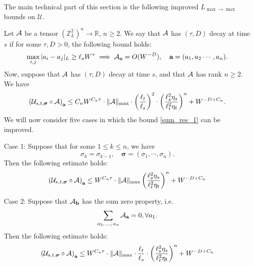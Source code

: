  \bigskip

The main technical part of this section is the following improved $L_{\max\to \max}$ bounds on $\mathcal{U}$.
 
\begin{lemma}\label{lem:sum_decay}

Let $\cal A$ be a tensor $\left(\mathbb{Z}_L^2\right)^n\to \mathbb R$, $n\ge 2$. We say that $\cal A$ has $(\tau, D)$ decay at time $s$ if  for some $\tau,D>0$, the following bound holds:
\begin{equation}\label{deccA0}
    \max_{i,j}|a_i-a_j|_{L}\ge \ell_s W^{\tau} \implies  {\cal A}_{\textbf{a}}=O(W^{-D}),\quad \textbf{a}=(a_1,a_2\cdots, a_n) .
\end{equation}
Now, suppose that $\cal A$ has $(\tau, D)$ decay at time $s$, and that $\cal A$ has rank $n\geq2$. We have
\begin{align}\label{sum_res_1}
    \left({\cal U}_{s,t,\boldsymbol{\sigma}} \circ {\cal A}\right)_\textbf{a} \le C_n W^{C_n\tau}\cdot   \|{\cal A}\|_{\max}
    \cdot \left(\frac{\ell_t}{\ell_s}\right)^{2}
    \cdot \left(\frac{\ell_s^{2}\eta_s}{\ell_t^{2}\eta_t}\right)^{n} +W^{-D+C_n}.
\end{align}
We will now consider five cases in which the bound \eqref{sum_res_1} can be improved.

Case 1: Suppose that for some $1\leq k\leq n$, we have
$$ 
\sigma_k=\sigma_{k-1}, \quad \boldsymbol{\sigma}=(\sigma_1,\cdots, \sigma_n).
$$ 
Then the following estimate holds:
\begin{align}\label{nonalternating}
    \left({\cal U}_{s,t,\boldsymbol{\sigma}} \circ {\cal A}\right)_\textbf{a} \le W^{C_n\tau}\cdot   \|{\cal A}\|_{\max}\left(\frac{\ell_s^{2}\eta_s}{\ell_t^{2}\eta_t}\right)^{n } +W^{-D+C_n}
\end{align}

Case 2: Suppose that ${\cal A}_{\textbf{b}}$ has the sum zero property, i.e.
\begin{align}\label{sumAzero}
 \sum_{a_2,\,\ldots,\, a_n}{\cal A}_{\textbf{a}}=0, \forall a_1.
\end{align}
Then the following estimate holds:
\begin{align}\label{sum_res_2}
    \left({\cal U}_{s,t,\boldsymbol{\sigma}} \circ {\cal A}\right)_\textbf{a} \le W^{C_n\tau}\cdot   \|{\cal A}\|_{\max}\cdot\frac{\ell_{t}}{\ell_{s}}
    \cdot \left(\frac{\ell_s^{2}\eta_s}{\ell_t^{2}\eta_t}\right)^{n } +W^{-D+C_n}
\end{align} 


\end{lemma}
